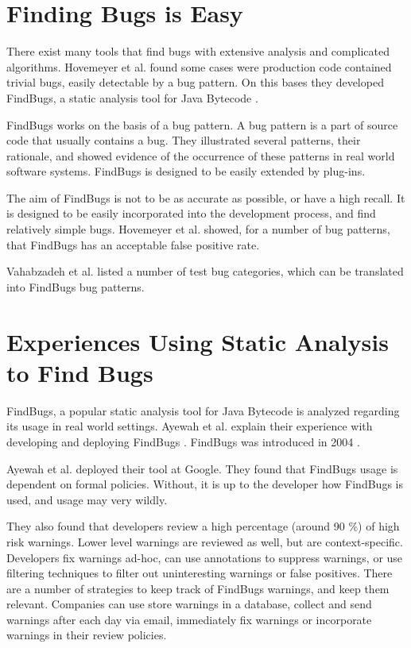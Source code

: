 \documentclass{uvamscse}
\newcommand{\Atestbugs}{Vahabzadeh et al.}
\newcommand{\AFBEval}{Ayewah et al.}
\newcommand{\AFB}{Hovemeyer et al.}
\begin{document}
\section{Finding Bugs is Easy}
There exist many tools that find bugs with extensive analysis and complicated algorithms. \AFB{} found some cases were production code contained trivial bugs, easily detectable by a bug pattern. On this bases they developed FindBugs, a static analysis tool for Java Bytecode \cite{hovemeyer2004finding}. 

FindBugs works on the basis of a bug pattern. A bug pattern is a part of source code that usually contains a bug. They illustrated several patterns, their rationale, and showed evidence of the occurrence of these patterns in real world software systems. FindBugs is designed to be easily extended by plug-ins. 

The aim of FindBugs is not to be as accurate as possible, or have a high recall. It is designed to be easily incorporated into the development process, and find relatively simple bugs. \AFB{} showed, for a number of bug patterns, that FindBugs has an acceptable false positive rate.

\Atestbugs{} listed a number of test bug categories, which can be translated into FindBugs bug patterns. 

\section{Experiences Using Static Analysis to Find Bugs}

FindBugs, a popular static analysis tool for Java Bytecode is analyzed regarding its usage in real world settings. \AFBEval{} explain their experience with developing and deploying FindBugs \cite{ayewah2008using}. FindBugs was introduced in 2004 \cite{hovemeyer2004finding}.

\AFBEval{} deployed their tool at Google. They found that FindBugs usage is dependent on formal policies. Without, it is up to the developer how FindBugs is used, and usage may very wildly. 

They also found that developers review a high percentage (around 90 \%) of high risk warnings. Lower level warnings are reviewed as well, but are context-specific. Developers fix warnings ad-hoc, can use annotations to suppress warnings, or use filtering techniques to filter out uninteresting warnings or false positives. There are a number of strategies to keep track of FindBugs warnings, and keep them relevant. Companies can use store warnings in a database, collect and send warnings after each day via email, immediately fix warnings or incorporate warnings in their review policies.
\end{document}
